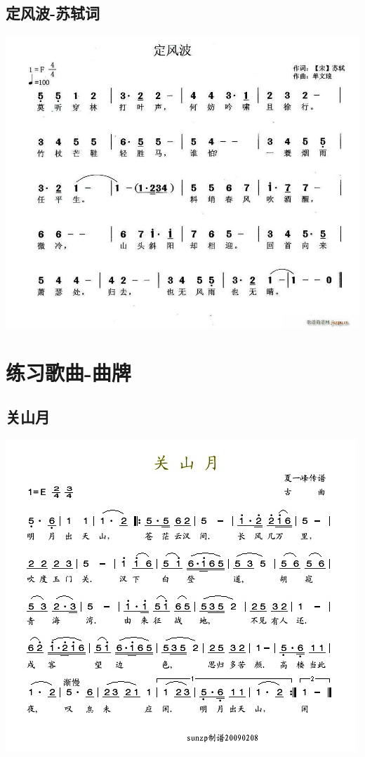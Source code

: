 \documentclass[cn,pad,chinese,chinesefont=nofont,math=newtx]{elegantbook}
\begin{document}
\section{定风波-苏轼词}
    \includegraphics[width=\textwidth]{dongxiao/20200411-定风波.jpg}
\chapter{练习歌曲-曲牌}
\section{关山月}
    \includegraphics[width=\textwidth]{dongxiao/20200411-清平乐-关山月.jpg}
\end{document}
